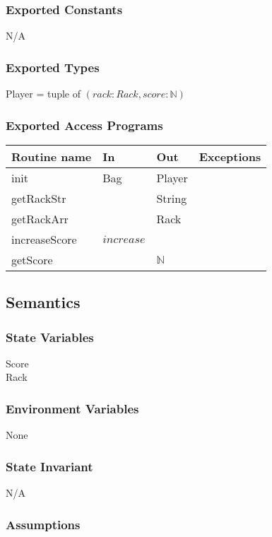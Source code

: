 \documentclass[12pt]{article}
\begin{document}
\subsubsection* {Exported Constants}
N/A
\subsubsection* {Exported Types}

Player = tuple of $(rack: Rack, score:\mathbb{N})$

\subsubsection* {Exported Access Programs}

\begin{tabular}{| l | l | l | l |}
\hline
\textbf{Routine name} & \textbf{In} & \textbf{Out} & \textbf{Exceptions}\\
\hline
init & Bag & Player &  \\
\hline
getRackStr & & String & \\
\hline
getRackArr & & Rack & \\
\hline
increaseScore & $increase$ &  & \\
\hline
getScore & & $\mathbb{N}$ & \\
\hline
\end{tabular}

\subsection* {Semantics}

\subsubsection* {State Variables}

Score \\
Rack

\subsubsection* {Environment Variables}
None
\subsubsection* {State Invariant}

N/A

\subsubsection* {Assumptions}
\end{document}
